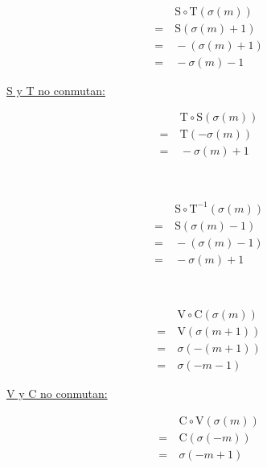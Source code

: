 	\begin{center}
		\begin{multicols}{3}
			\ \linebreak
			
			\begin{align*}
			&\ \text{S}\circ\text{T}(\sigma(m))\\
			=&\ \text{S}(\sigma(m)+1)\\
			=&\ -(\sigma(m)+1)\\
			=&\ -\sigma(m)-1
			\end{align*}
			
			\underline{S y T no conmutan:}
			
			\begin{align*}
			&\ \text{T}\circ\text{S}(\sigma(m))\\
			=&\ \text{T}(-\sigma(m))\\
			=&\ -\sigma(m)+1
			\end{align*}			
			
			\ \linebreak
			
			\begin{align*}
			&\ \text{S}\circ\text{T}^{-1}(\sigma(m))\\
			=&\ \text{S}(\sigma(m)-1)\\
			=&\ -(\sigma(m)-1)\\
			=&\ -\sigma(m)+1
			\end{align*}
		\end{multicols}
		
		\begin{multicols}{3}
			\ \linebreak
			
			\begin{align*}
			&\ \text{V}\circ\text{C}(\sigma(m))\\
			=&\ \text{V}(\sigma(m+1))\\
			=&\ \sigma(-(m+1))\\
			=&\ \sigma(-m-1)
			\end{align*}
			
			\underline{V y C no conmutan:}
			
			\begin{align*}
			&\ \text{C}\circ\text{V}(\sigma(m))\\
			=&\ \text{C}(\sigma(-m))\\
			=&\ \sigma(-m+1)
			\end{align*}
			
			\ \linebreak
			

\end{multicols}
\end{center}
